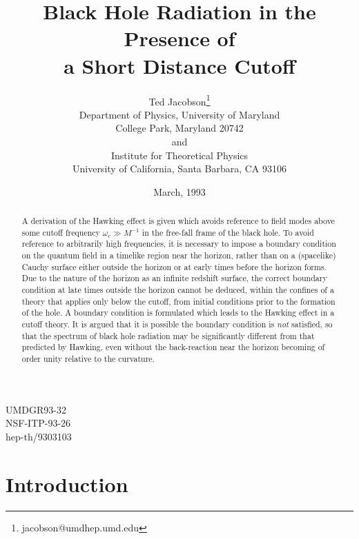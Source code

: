 \documentclass[12pt]{article}
\begin{document}
\title{\Large Black Hole Radiation in the Presence of \\a Short Distance
Cutoff}%
\author{\large Ted Jacobson\thanks{jacobson@umdhep.umd.edu}\\
Department of Physics, University of Maryland\\
College Park, Maryland 20742\\
and\\
Institute for Theoretical Physics\\
University of California, Santa Barbara, CA 93106}
\date{March, 1993}
\maketitle

\vspace{-12cm}
\begin{flushright}
UMDGR93-32\\NSF-ITP-93-26\\hep-th/9303103
\end{flushright}
\vspace{10cm}

\begin{abstract}
A derivation of the Hawking effect is given which avoids
reference to field modes above some cutoff frequency
$\omega_c\gg M^{-1}$ in the free-fall frame of the black
hole. To avoid reference to arbitrarily high frequencies, it
is necessary to impose a boundary condition on the quantum
field in a timelike region near the horizon, rather than on
a (spacelike) Cauchy surface either outside the horizon or
at early times before the horizon forms. Due to the nature
of the horizon as an infinite redshift surface, the correct
boundary condition at late times outside the horizon cannot
be deduced, within the confines of a theory that applies only
below the cutoff, from initial conditions prior to the formation of
the hole. A boundary condition is formulated which leads to the
Hawking effect in a cutoff theory.
It is argued that it is possible the
boundary condition is {\it not} satisfied, so that the
spectrum of black hole radiation may be significantly
different from that predicted by Hawking, even without the
back-reaction near the horizon becoming of order unity relative
to the curvature.
\end{abstract}

\newpage

\section{Introduction}
\label{sec:1}
\end{document}

